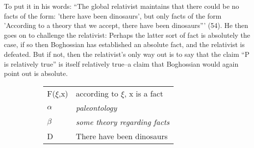 \documentclass[12pt]{article}
\begin{document}
\begin{flushleft}
To put it in his words: ``The global relativist maintains that there could be no facts of the form: 'there have been dinosaurs', but only facts of the form 'According to a theory that we accept, there have been dinosaurs''' (54).
He then goes on to challenge the relativist:
Perhaps the latter sort of fact is absolutely the case, if so then Boghossian has established an absolute fact, and the relativist is defeated.
But if not, then the relativist's only way out is to say that the claim ``P is relatively true'' is itself relatively true--a claim that Boghossian would again point out is absolute.

\begin{figure}[h]
    \centering
    \begin{subfigure}{\linewidth}
        \centering
        \begin{tabular}{l|l}
            \hline
            F($\xi$,x) & according to $\xi$, x is a fact\\
            $\alpha$ & \textit{paleontology} \\
            $\beta$ & \textit{some theory regarding facts} \\
            D & There have been dinosaurs\\
            \hline
        \end{tabular}
    \end{subfigure}\\
    \par\bigskip
    \begin{subfigure}{.20\linewidth}
        \centering
        \hspace*{2em}%
        \fitchprf
        {
            \pline{\mathnormal{\alpha}}
        }
        {
            \pline{\bigstar} \\
        }
        \caption{}
        \label{dinosaur0}
    \end{subfigure}%
    \begin{subfigure}{.20\linewidth}
        \centering
        \fitchctx
        {
            \pline{\bigstar} \\
            \subproof
            {
                \pline{\mathnormal{\alpha}}
            }
            {
            }
        }
        \caption{}
        \label{dinosaur1}
     \end{subfigure}%
    \begin{subfigure}{.20\linewidth}
        \centering
        \hspace*{2em}%
        \fitchprf

\end{subfigure}
\end{figure}
\end{flushleft}
\end{document}
